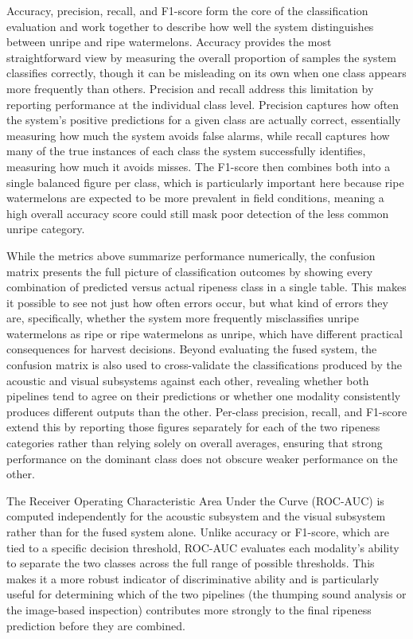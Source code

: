 \begin{thesisprose}
Accuracy, precision, recall, and F1-score form the core of the classification evaluation and work together to describe how well the system distinguishes between unripe and ripe watermelons. Accuracy provides the most straightforward view by measuring the overall proportion of samples the system classifies correctly, though it can be misleading on its own when one class appears more frequently than others. Precision and recall address this limitation by reporting performance at the individual class level. Precision captures how often the system's positive predictions for a given class are actually correct, essentially measuring how much the system avoids false alarms, while recall captures how many of the true instances of each class the system successfully identifies, measuring how much it avoids misses. The F1-score then combines both into a single balanced figure per class, which is particularly important here because ripe watermelons are expected to be more prevalent in field conditions, meaning a high overall accuracy score could still mask poor detection of the less common unripe category.

While the metrics above summarize performance numerically, the confusion matrix presents the full picture of classification outcomes by showing every combination of predicted versus actual ripeness class in a single table. This makes it possible to see not just how often errors occur, but what kind of errors they are, specifically, whether the system more frequently misclassifies unripe watermelons as ripe or ripe watermelons as unripe, which have different practical consequences for harvest decisions. Beyond evaluating the fused system, the confusion matrix is also used to cross-validate the classifications produced by the acoustic and visual subsystems against each other, revealing whether both pipelines tend to agree on their predictions or whether one modality consistently produces different outputs than the other. Per-class precision, recall, and F1-score extend this by reporting those figures separately for each of the two ripeness categories rather than relying solely on overall averages, ensuring that strong performance on the dominant class does not obscure weaker performance on the other.

The Receiver Operating Characteristic Area Under the Curve (ROC-AUC) is computed independently for the acoustic subsystem and the visual subsystem rather than for the fused system alone. Unlike accuracy or F1-score, which are tied to a specific decision threshold, ROC-AUC evaluates each modality's ability to separate the two classes across the full range of possible thresholds. This makes it a more robust indicator of discriminative ability and is particularly useful for determining which of the two pipelines (the thumping sound analysis or the image-based inspection) contributes more strongly to the final ripeness prediction before they are combined.


\end{thesisprose}
